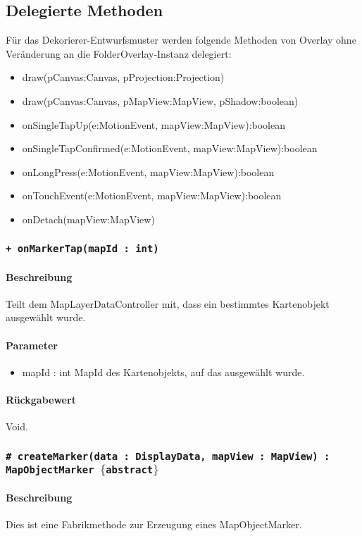 \subsection{Delegierte Methoden}
Für das Dekorierer-Entwurfsmuster werden folgende Methoden von Overlay ohne Veränderung 
an die FolderOverlay-Instanz delegiert:
\begin{itemize}
    \item draw(pCanvas:Canvas, pProjection:Projection)
    \item draw(pCanvas:Canvas, pMapView:MapView, pShadow:boolean)
    \item onSingleTapUp(e:MotionEvent, mapView:MapView):boolean
    \item onSingleTapConfirmed(e:MotionEvent, mapView:MapView):boolean
    \item onLongPress(e:MotionEvent, mapView:MapView):boolean
    \item onTouchEvent(e:MotionEvent, mapView:MapView):boolean
    \item onDetach(mapView:MapView)
\end{itemize}

\subsubsection{\texttt{+ onMarkerTap(mapId : int)}}%
\paragraph*{Beschreibung}
Teilt dem MapLayerDataController mit, dass ein bestimmtes Kartenobjekt ausgewählt wurde.
\paragraph*{Parameter}
\begin{itemize}
    \item mapId : int MapId des Kartenobjekts, auf das ausgewählt wurde.
\end{itemize}
\paragraph*{Rückgabewert}
Void.

\subsubsection{\texttt{\# createMarker(data : DisplayData, mapView : MapView) : MapObjectMarker $\lbrace$abstract$\rbrace$}}%
\paragraph*{Beschreibung}
Dies ist eine Fabrikmethode zur Erzeugung eines MapObjectMarker.
